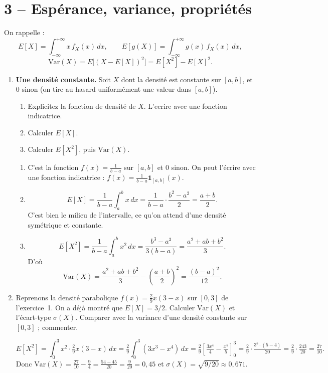 \section*{3 -- Espérance, variance, propriétés}

On rappelle :
\[
  E[X]=\int_{-\infty}^{+\infty}\!x\,f_X(x)\,dx,\qquad
  E[g(X)]=\int_{-\infty}^{+\infty}\!g(x)\,f_X(x)\,dx,
\]
\[
  \text{Var}(X)=E\bigl[(X-E[X])^2\bigr]=E[X^2]-E[X]^2.
\]

\begin{enumerate}
  \item \textbf{Une densité constante.}
  Soit $X$ dont la densité est constante
  sur $[a,b]$, et $0$ sinon (on \og tire au hasard uniformément \fg{}
  une valeur dans $[a,b]$).
  \begin{enumerate}
    \item Explicitez la fonction de densité de $X$. L'ecrire avec une fonction indicatrice. 
    \item Calculer $E[X]$.
    \item Calculer $E[X^2]$, puis $\text{Var}(X)$.
  \end{enumerate}
  \begin{solution}
    \begin{enumerate}
    \item C'est la fonction $f(x) = \frac{1}{b-a}$ sur $[a,b]$ et $0$ sinon.
    On peut l'écrire avec une fonction indicatrice : $f(x) = \frac{1}{b-a} \mathbf{1}_{[a,b]}(x)$.
    \item 
    \[
      E[X]=\frac{1}{b-a}\int_a^b x\,dx
      =\frac{1}{b-a}\cdot\frac{b^2-a^2}{2}=\frac{a+b}{2}.
    \]
    C'est bien le \og milieu \fg{} de l'intervalle, ce qu'on attend
    d'une densité symétrique et constante.

    \item
    \[
      E[X^2]=\frac{1}{b-a}\int_a^b x^2\,dx
      =\frac{b^3-a^3}{3(b-a)}=\frac{a^2+ab+b^2}{3}.
    \]
    D'où
    \[
      \text{Var}(X)=\frac{a^2+ab+b^2}{3}-\left(\frac{a+b}{2}\right)^2
      =\frac{(b-a)^2}{12}.
    \]
    \end{enumerate}
  \end{solution}

  \item Reprenons la densité parabolique $f(x)=\tfrac{2}{9}x(3-x)$
  sur $[0,3]$ de l'exercice~1. On a déjà montré que $E[X]=3/2$.
  Calculer $\text{Var}(X)$ et l'écart-type $\sigma(X)$.
  Comparer avec la variance d'une densité constante sur $[0,3]$ ;
  commenter.
  \begin{solution}
    \[
      E[X^2]=\int_0^3 x^2\cdot\tfrac{2}{9}x(3-x)\,dx
      =\tfrac{2}{9}\int_0^3(3x^3-x^4)\,dx
      =\tfrac{2}{9}\left[\tfrac{3x^4}{4}-\tfrac{x^5}{5}\right]_0^3
      =\tfrac{2}{9}\cdot\tfrac{3^5\cdot (5-4)}{20}
      =\tfrac{2}{9}\cdot\tfrac{243}{20}=\tfrac{27}{10}.
    \]
    Donc $\text{Var}(X)=\tfrac{27}{10}-\tfrac{9}{4}
    =\tfrac{54-45}{20}=\tfrac{9}{20}=0{,}45$ et
    $\sigma(X)=\sqrt{9/20}\approx 0{,}671$.


\end{solution}
\end{enumerate}
